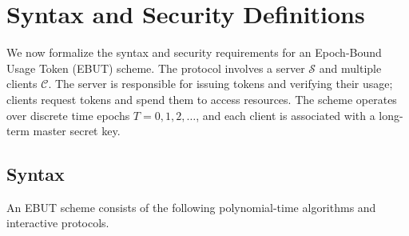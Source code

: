 \documentclass[11pt]{article}
\theoremstyle{definitionstyle}
\theoremstyle{plain}
\begin{document}
\section{Syntax and Security Definitions}
\label{sec:defs}

We now formalize the syntax and security requirements for an Epoch-Bound Usage Token (EBUT) scheme. The protocol involves a server $\mathcal{S}$ and multiple clients $\mathcal{C}$. The server is responsible for issuing tokens and verifying their usage; clients request tokens and spend them to access resources. The scheme operates over discrete time epochs $T = 0,1,2,\dots$, and each client is associated with a long-term master secret key.

\subsection{Syntax}
An EBUT scheme consists of the following polynomial-time algorithms and interactive protocols.
\end{document}
